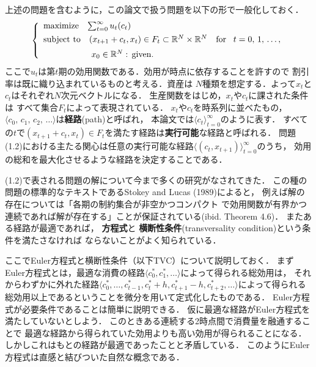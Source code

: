 \documentclass[a4paper,11pt]{jsarticle}
\begin{document}
上述の問題を含むように，この論文で扱う問題を以下の形で一般化しておく．
\begin{align}
	\left\{
		\begin{array}{l}
			\mathrm{maximize} \hspace{3mm} \sum_{t=0}^\infty u_t(c_t)\vspace{1.4mm}\\
			\mathrm{subject}\hspace{1.2mm}\mathrm{to}\quad (x_{t+1}+c_t,x_t) \in F_t
 			\subset \mathbb{R}^N \times \mathbb{R}^N\quad \mathrm{for}\quad\! t=0,\,1,\,\ldots,\vspace{2mm}\\
        		\hspace{19.7mm}x_0 \in \mathbb{R}^N :\, \mathrm{given}.
		\end{array}
        \right.
\end{align}
ここで$u_t$は第$t$期の効用関数である．効用が時点に依存することを許すので
割引率は既に織り込まれているものと考える．資産は
$N$種類を想定する．よって$x_t$と$c_t$はそれぞれ$N$次元ベクトルになる．
生産関数をはじめ，$x_t$や$c_t$に課された条件は
すべて集合$F_t$によって表現されている．
$x_t$や$c_t$を時系列に並べたもの，
$\langle c_0,\,c_1,\,c_2,\,\ldots \rangle$は\textbf{経路}(path)と呼ばれ，
本論文では$\langle c_{t} \rangle_{t=0}^\infty$のように表す．
すべての$t$で$(x_{t+1}+c_t,x_t)\in F_t$を満たす経路は\textbf{実行可能}な経路と呼ばれる．
問題(1.2)における主たる関心は任意の実行可能な経路$\langle (c_t,x_{t+1}) \rangle_{t=0}^\infty$のうち，
効用の総和を最大化させるような経路を決定することである．

(1.2)で表される問題の解について今まで多くの研究がなされてきた．
この種の問題の標準的なテキストであるStokey and Lucas (1989)によると，
例えば解の存在については「各期の制約集合が非空かつコンパクト
で効用関数が有界かつ連続であれば解が存在する」ことが保証されている(ibid. Theorem 4.6)．
またある経路が最適であれば，
\hspace{.6mm}\textbf{方程式}と
\textbf{横断性条件}(transversality condition)という条件を満たさなければ
ならないことがよく知られている．

ここでEuler方程式と横断性条件（以下TVC）について説明しておく．
まずEuler方程式とは，最適な消費の経路$\langle c_0^*,c_1^*,\ldots \rangle$によって得られる総効用は，
それからわずかに外れた経路$\langle c_0^*,\ldots,c_{t-1}^*,c_t^*+h,c_{t+1}^*-h,c_{t+2}^*,\ldots \rangle$によって得られる
総効用以上であるということを微分を用いて定式化したものである．
Euler方程式が必要条件であることは簡単に説明できる．
仮に最適な経路がEuler方程式を満たしていないとしよう．
このときある連続する2時点間で消費量を融通することで
最適な経路から得られていた効用よりも高い効用が得られることになる．
しかしこれはもとの経路が最適であったことと矛盾している．
このようにEuler方程式は直感と結びついた自然な概念である．
\end{document}
